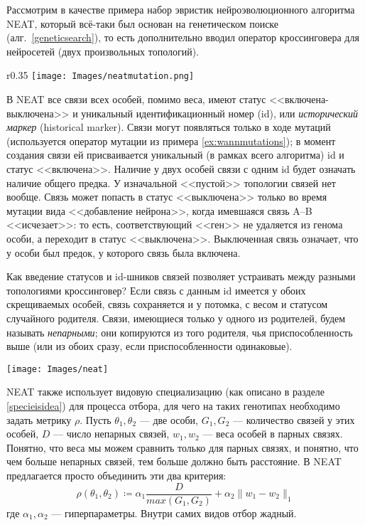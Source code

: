 \begin{example}
Рассмотрим в качестве примера набор эвристик нейроэволюционного алгоритма NEAT, который всё-таки был основан на генетическом поиске (алг.~\ref{geneticsearch}), то есть дополнительно вводил оператор кроссинговера для нейросетей (двух произвольных топологий).

\begin{wrapfigure}{r}{0.35\textwidth}
\centering
\vspace{-0.5cm}
\texttt{[image: Images/neatmutation.png]}
\vspace{-0.7cm}
\end{wrapfigure}

В NEAT все связи всех особей, помимо веса, имеют статус <<включена-выключена>> и уникальный идентификационный номер (id), или \emph{исторический маркер} (historical marker). Связи могут появляться только в ходе мутаций (используется оператор мутации из примера \ref{ex:wannmutations}); в момент создания связи ей присваивается уникальный (в рамках всего алгоритма) id и статус <<включена>>. Наличие у двух особей связи с одним id будет означать наличие общего предка. У изначальной <<пустой>> топологии связей нет вообще. Связь может попасть в статус <<выключена>> только во время мутации вида <<добавление нейрона>>, когда имевшаяся связь A--B <<исчезает>>: то есть, соответствующий <<ген>> не удаляется из генома особи, а переходит в статус <<выключена>>. Выключенная связь означает, что у особи был предок, у которого связь была включена.

Как введение статусов и id-шников связей позволяет устраивать между разными топологиями кроссинговер? Если связь с данным id имеется у обоих скрещиваемых особей, связь сохраняется и у потомка, с весом и статусом случайного родителя. Связи, имеющиеся только у одного из родителей, будем называть \emph{непарными}; они копируются из того родителя, чья приспособленность выше (или из обоих сразу, если приспособленности одинаковые).

\begin{center}
    \texttt{[image: Images/neat]}
\end{center}

NEAT также использует видовую специализацию (как описано в разделе \ref{specieisidea}) для процесса отбора, для чего на таких генотипах необходимо задать метрику $\rho$. Пусть $\theta_1, \theta_2$ --- две особи, $G_1, G_2$ --- количество связей у этих особей, $D$ --- число непарных связей, $w_1, w_2$ --- веса особей в парных связях. Понятно, что веса мы можем сравнить только для парных связях, и понятно, что чем больше непарных связей, тем больше должно быть расстояние. В NEAT предлагается просто объединить эти два критерия: 
$$\rho(\theta_1, \theta_2) \coloneqq \alpha_1 \frac{D}{max(G_1, G_2)} + \alpha_2 \|w_1 - w_2\|_1$$
где $\alpha_1, \alpha_2$ --- гиперпараметры. Внутри самих видов отбор жадный.


\end{example}
